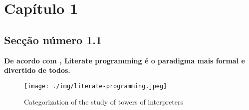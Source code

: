 \documentclass[
  12pt, a4paper,		%
  openright,			%
  oneside,			%
  brazil, english		%
  ]{abntex2}
\begin{document}

\chapter{Capítulo 1}
\section{Secção número 1.1}

\textbf{De acordo com \cite{knuth1984literate}, Literate programming é o paradigma mais formal e divertido de todos.}

\begin{figure}[ht]
  \centering
  \caption{\label{fig:tower2} Categorization of the study of towers of interpreters}
  \texttt{[image: ./img/literate-programming.jpeg]}
\end{figure}

\lipsum[1-2] %

\end{document}
